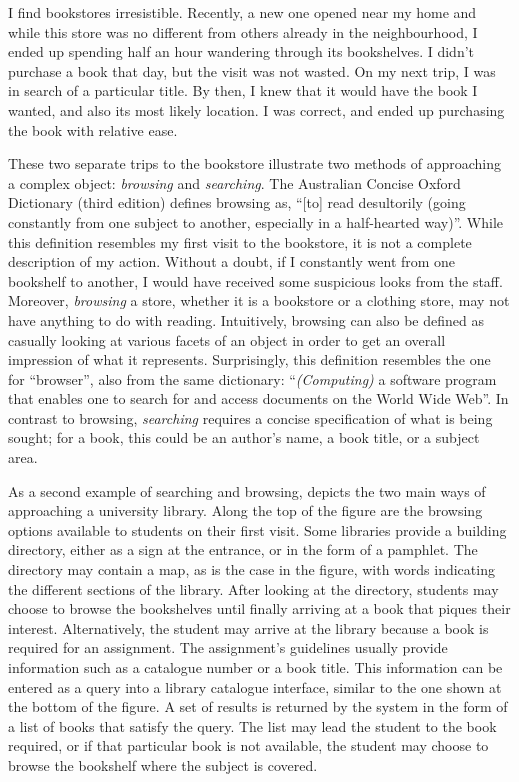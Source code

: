 
I find bookstores irresistible.  Recently, a new one opened
near my home and while this store was no different from others 
already in the neighbourhood, I ended up spending half an hour
wandering through its bookshelves.  I didn't purchase a book
that day, but the visit was not wasted.  On my next trip, I was
in search of a particular title.  By then,
I knew that it would have the book I wanted, and also
its most likely location.
I was correct, and ended up purchasing the book with relative ease.

These two separate trips to the bookstore illustrate two methods
of approaching a complex object:  {\emph {browsing}} and {\emph {searching}}.
The Australian Concise Oxford Dictionary (third edition) defines
browsing as, ``[to] read 
desultorily (going constantly from one subject to another, especially
in a half-hearted way)''.  While this definition resembles my 
first visit to the bookstore, it is not a complete description of
my action.  Without a doubt, if I constantly went from
one bookshelf to another, I would have received some suspicious looks
from the staff.  Moreover, {\emph {browsing}} a store, whether it 
is a bookstore
or a clothing store, may not have anything to do with reading.
Intuitively, browsing can also be defined
as casually looking at various facets of an object in order to
get an overall impression of what it represents.  Surprisingly,
this definition resembles the one for
``browser'', also from the same dictionary:  
``{\emph {(Computing)}} a software program that enables one to 
search for and access documents on the World Wide Web''.  
In contrast to browsing, {\emph {searching}} requires a concise
specification of what is being sought; for a book, this could be
an author's name, a book title, or a subject area.

As a second example of searching and browsing,  
depicts the two main ways of approaching
a university library.  Along the top of the figure
are the browsing options available to students on their first
visit.  Some libraries provide a 
building directory, either as a sign at the entrance, or in the
form of a pamphlet.  The directory may contain a map, as is the
case in the figure, with words indicating the different sections of
the library.  After looking at the directory, students may choose
to browse the bookshelves until finally arriving at a book that
piques their interest.  Alternatively, the student may arrive at the
library because a book is required for an assignment.  The assignment's
guidelines usually provide information such as
a catalogue number or a book title.  This information
can be entered as a query into a library catalogue 
interface, similar to the one shown at the 
bottom of the figure.  A set of results is returned by
the system in the
form of a list of books that satisfy the query.  
The list may lead the student to the book 
required, or if that particular book is not available,
the student may choose to browse the bookshelf where
the subject is covered.

